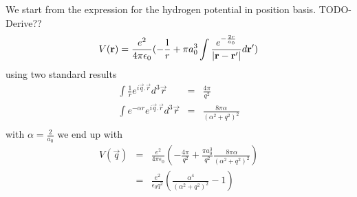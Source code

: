 We start from the expression for the
hydrogen potential in position basis.
TODO-Derive??
\begin{equation}
    V(\mathbf{r}) = \frac{e^2}{4 \pi \epsilon_0}(
    -\frac{1}{r}
    + \pi a_0^3\int{\frac{e^{-\frac{2r}{a_0}}}{
            \lvert\mathbf{r} - \mathbf{r'}\rvert} d\mathbf{r}'})
\end{equation}
using two standard results
\begin{eqnarray}
    \int{\frac{1}{r} e^{i\vec{q}.\vec{r}} d^3\vec{r}}
    &=& \frac{4 \pi}{q^2}\\
    \int{e^{-\alpha r} e^{i\vec{q}.\vec{r}} d^3\vec{r}}
    &=& \frac{8 \pi \alpha}{{(\alpha^2 + q^2)}^2}\\
\end{eqnarray}
with \(\alpha = \frac{2}{a_0}\) we end up
with
\begin{eqnarray}
    V(\vec{q}) &=& \frac{e^2}{4 \pi \epsilon_0}(
    - \frac{4\pi}{q^2}
    + \frac{\pi a_0^3}{q^2}
    \frac{8 \pi \alpha}{{(\alpha^2 + q^2)}^2})\\
    &=& \frac{e^2}{\epsilon_0 q^2}(
    \frac{ \alpha^4}{{(\alpha^2 + q^2)}^2} - 1
    )
\end{eqnarray}